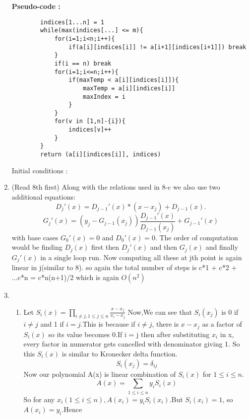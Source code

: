 \documentclass[12pt]{article}
\begin{document}
\begin{enumerate}
    \textbf{Pseudo-code :}
    \begin{verbatim}
        indices[1...n] = 1
        while(max(indices[...] <= m){
            for(i=1;i<n;i++){
                if(a[i][indices[i]] != a[i+1][indices[i+1]]) break
            }
            if(i == n) break
            for(i=1;i<=n;i++){
                if(maxTemp < a[i][indices[i]]){
                    maxTemp = a[i][indices[i]]
                    maxIndex = i
                }
            }
            for(v in [1,n]-{i}){
                indices[v]++
            }
        }
        return (a[i][indices[i]], indices)
    \end{verbatim}
    Initial conditions : 
    \item
    (Read 8th first)
    Along with the relations used in 8-c we also use two additional equations:
    \begin{equation*}
        D_j'(x) = D_{j-1}'(x) * (x-x_j) + D_{j-1}(x).
    \end{equation*}
    \begin{equation*}
        G_j'(x) = (y_j - G_{j-1}(x_j)) \frac{D_{j-1}'(x)}{D_{j-1}(x_j)} + G_{j-1}'(x)
    \end{equation*}
    with base cases $G_0'(x) = 0$ and $D_0'(x) = 0$.
    The order of computation would be finding $D_j(x)$ first then $D_j'(x)$ and then $G_j(x)$ and finally $G_j'(x)$ in a single loop run.
    Now computing all these at jth point is again linear in j(similar to 8). so again the total number of steps is c*1 + c*2 + ...c*n = c*n(n+1)/2 which is again $O(n^2)$
    \item
    \begin{enumerate}
        \item Let $S_i(x) = \prod_{i\neq j,1 \leq j \leq n} \frac{x-x_j}{x_i-x_j}$
Now,We can see that $S_i(x_j)$ is 0 if $i \neq j$ and 1 if $i = j$.This is because if $i \neq j$, there is $x-x_j$ as a factor of $S_i(x)$ so its value becomes 0.If i = j then after substituting $x_i$ in x, every factor in numerator gets cancelled with denominator giving 1.
So this $S_i(x)$ is similar to Kronecker delta function.
\begin{equation*}
    S_i(x_j) = \delta_{ij}
\end{equation*}
Now our polynomial A(x) is linear combination of $S_i(x)$ for $1 \leq i \leq n$.
\begin{equation*}
    A(x) = \sum_{1 \leq i \leq n}{y_i S_i(x)}
\end{equation*}
So for any $x_i(1 \leq i \leq n) , A(x_i) = y_i S_i(x_i)$.But $S_i(x_i)=1$, so $A(x_i)=y_i$.Hence

\end{enumerate}
\end{enumerate}
\end{document}
